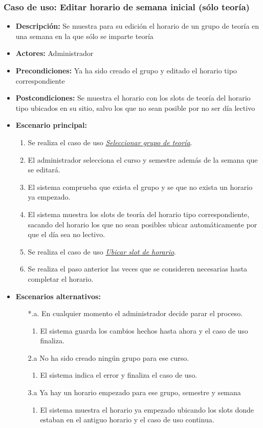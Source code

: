 \documentclass{book}
\begin{document}
\subsubsection*{Caso de uso: Editar horario de semana inicial (sólo teoría)}
\begin{itemize}
\item{\bf Descripción:} Se muestra para su edición el horario de un grupo de teoría en una semana en la que sólo se imparte teoría
\item{\bf Actores:} Administrador
\item{\bf Precondiciones:} Ya ha sido creado el grupo y editado el horario tipo correspondiente
\item{\bf Postcondiciones:} Se muestra el horario con los slots de teoría del horario tipo ubicados en su sitio, salvo los que no sean posible por no ser día lectivo
\item{\bf Escenario principal:}
	\begin{enumerate}
	\item Se realiza el caso de uso {\em \hyperref[select_grupo]{Seleccionar grupo de teoría}}.
	\item El administrador selecciona el curso y semestre además de la semana que se editará.
	\item El sistema comprueba que exista el grupo y se que no exista un horario ya empezado.
	\item El sistema muestra los slots de teoría del horario tipo correspondiente, sacando del horario los que no sean posibles ubicar automáticamente por que el día sea no lectivo.
	\item Se realiza el caso de uso {\em \hyperref[guardar_slot]{Ubicar slot de horario}}.
	\item Se realiza el paso anterior las veces que se consideren necesarias hasta completar el horario.
	\end{enumerate}
\item{\bf Escenarios alternativos:}
	\begin{itemize}
		\item[*.a.] En cualquier momento el administrador decide parar el proceso.
		\begin{enumerate}
			\item El sistema guarda los cambios hechos hasta ahora y el caso de uso finaliza.
		\end{enumerate}
		\item[2.a] No ha sido creado ningún grupo para ese curso.
		\begin{enumerate}
			\item El sistema indica el error y finaliza el caso de uso.
		\end{enumerate}
		\item[3.a] Ya hay un horario empezado para ese grupo, semestre y semana
		\begin{enumerate}
			\item El sistema muestra el horario ya empezado ubicando los slots donde estaban en el antiguo horario y el caso de uso continua.
		\end{enumerate}
	\end{itemize}
\end{itemize}
\end{document}
